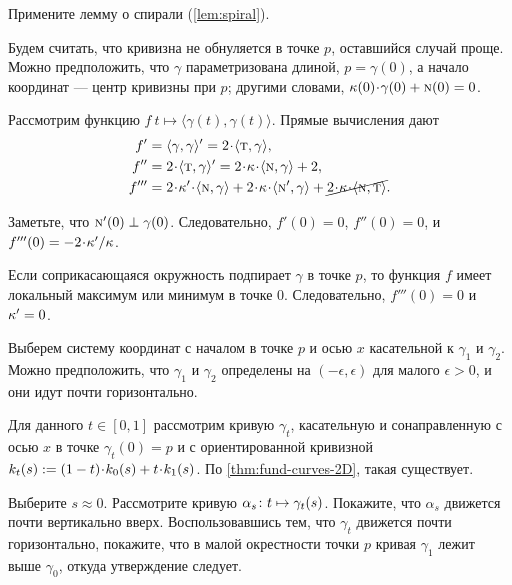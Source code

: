 
\setcounter{eqtn}{0}

Примените лемму о спирали (\ref{lem:spiral}).

Будем считать, что кривизна не обнуляется в точке $p$, оставшийся случай проще.
Можно предположить, что $\gamma$ параметризована длиной, $p=\gamma(0)$, а начало координат --- центр кривизны при $p$;
другими словами, $\kur(0)\cdot\gamma(0)\z+ \norm(0)=0$.

Рассмотрим функцию $f\:t\mapsto \langle\gamma(t),\gamma(t)\rangle$.
Прямые вычисления дают 
\begin{align*}
f'
&=\langle\gamma,\gamma\rangle'
=2\cdot\langle\tan,\gamma\rangle,
\\
f''
&=2\cdot\langle\tan,\gamma\rangle'
=2\cdot\kur\cdot\langle\norm,\gamma\rangle+2,
\\
f'''
&=2\cdot\kur'\cdot\langle\norm,\gamma\rangle
+2\cdot\kur\cdot\langle\norm',\gamma\rangle+\cancel{2\cdot\kur\cdot\langle\norm,\tan\rangle}.
\end{align*}

Заметьте, что $\text{\sc{n}}'(0)\perp\gamma(0)$.
Следовательно, $f'(0)=0$, $f''(0)=0$, и $f'''(0)\z=-2\cdot\kur'/\kur$.

Если соприкасающаяся окружность подпирает $\gamma$ в точке $p$,
то функция $f$ имеет локальный максимум или минимум в точке $0$.
Следовательно, $f'''(0)=0$ и $\kappa'=0$.

Выберем систему координат с началом в точке $p$ и осью $x$ касательной к $\gamma_1$ и $\gamma_2$.
Можно предположить, что $\gamma_1$ и $\gamma_2$ определены на $(-\epsilon,\epsilon)$ для малого $\epsilon>0$,
и они идут почти горизонтально.

Для данного $t\in[0,1]$ рассмотрим кривую $\gamma_t$, касательную и сонаправленную с осью $x$ в точке $\gamma_t(0)=p$ и с ориентированной кривизной $\skur_t(s)\z\df(1\z-t)\cdot\skur_0(s)+t\cdot\skur_1(s)$.
По \ref{thm:fund-curves-2D}, такая существует.

Выберите $s\approx 0$.
Рассмотрите кривую $\alpha_s\:t\z\mapsto \gamma_t(s)$.
Покажите, что $\alpha_s$ движется почти вертикально вверх.
Воспользовавшись тем, что $\gamma_t$ движется почти горизонтально, покажите, что в малой окрестности точки $p$ кривая $\gamma_1$ лежит выше $\gamma_0$,
откуда утверждение следует.

